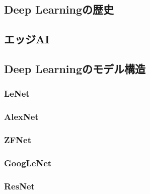 \subsection{Deep Learningの歴史}


\subsection{エッジAI}


%
%
%

\subsection{Deep Learningのモデル構造}
\subsubsection{LeNet}


\subsubsection{AlexNet}


\subsubsection{ZFNet}


\subsubsection{GoogLeNet}


\subsubsection{ResNet}


